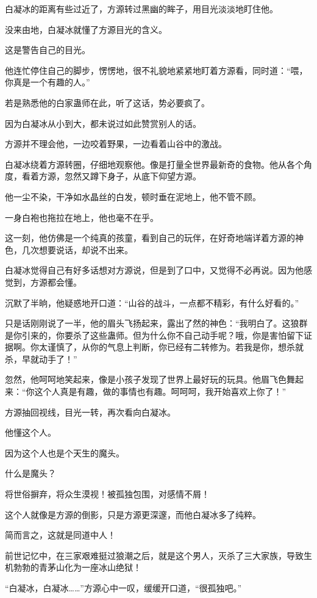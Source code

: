 \begin{this_body}
白凝冰的距离有些过近了，方源转过黑幽的眸子，用目光淡淡地盯住他。

没来由地，白凝冰就懂了方源目光的含义。

这是警告自己的目光。

他连忙停住自己的脚步，愣愣地，很不礼貌地紧紧地盯着方源看，同时道：“喂，你真是一个有趣的人。”

若是熟悉他的白家蛊师在此，听了这话，势必要疯了。

因为白凝冰从小到大，都未说过如此赞赏别人的话。

方源并不理会他，一边咬着野果，一边看着山谷中的激战。

白凝冰绕着方源转圈，仔细地观察他。像是打量全世界最新奇的食物。他从各个角度，看着方源，忽然又蹲下身子，从底下仰望方源。

他一尘不染，干净如水晶丝的白发，顿时垂在泥地上，他不管不顾。

一身白袍也拖拉在地上，他也毫不在乎。

这一刻，他仿佛是一个纯真的孩童，看到自己的玩伴，在好奇地端详着方源的神色，几次想要说话，却说不出来。

白凝冰觉得自己有好多话想对方源说，但是到了口中，又觉得不必再说。因为他感觉到，方源都会懂。

沉默了半晌，他疑惑地开口道：“山谷的战斗，一点都不精彩，有什么好看的。”

只是话刚刚说了一半，他的眉头飞扬起来，露出了然的神色：“我明白了。这狼群是你引来的，你要杀了这些蛊师。但为什么你不自己动手呢？哦，你是害怕留下证据啊。你太谨慎了，从你的气息上判断，你已经有二转修为。若我是你，想杀就杀，早就动手了！”

忽然，他呵呵地笑起来，像是小孩子发现了世界上最好玩的玩具。他眉飞色舞起来：“你这个人真是有趣，做的事情也有趣。呵呵呵，我开始喜欢上你了！”

方源抽回视线，目光一转，再次看向白凝冰。

他懂这个人。

因为这个人也是个天生的魔头。

什么是魔头？

将世俗摒弃，将众生漠视！被孤独包围，对感情不屑！

这个人就像是方源的倒影，只是方源更深邃，而他白凝冰多了纯粹。

简而言之，这就是同道中人！

前世记忆中，在三家艰难挺过狼潮之后，就是这个男人，灭杀了三大家族，导致生机勃勃的青茅山化为一座冰山绝狱！

“白凝冰，白凝冰……”方源心中一叹，缓缓开口道，“很孤独吧。”


\end{this_body}
